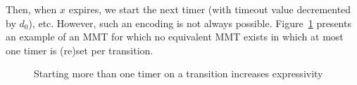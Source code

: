 Then, when $x$ expires, we start the next timer (with timeout value decremented by $d_0$), etc.
However, such an encoding is not always possible. 
\iflong
Figure~\ref{fig:counterexample} presents an example of an MMT for which no equivalent MMT exists
in which at most one timer is (re)set per transition.
\begin{figure}
\begin{center}
\caption{Starting more than one timer on a transition increases expressivity}
\label{fig:counterexample}
\end{center}
\end{figure}
\fi

